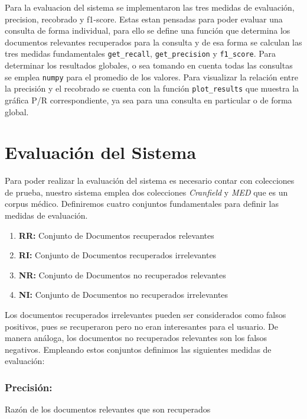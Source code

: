 \documentclass[runningheads,a4paper]{llncs}
\begin{document}

Para la evaluacion del sistema se implementaron las tres medidas de evaluación, precision, recobrado y f1-score. Estas estan pensadas para poder evaluar una consulta de forma individual, para ello se define una función que determina los documentos relevantes recuperados para la consulta y de esa forma se calculan las tres medidas fundamentales \verb*|get_recall|, \verb*|get_precision| y \verb*|f1_score|. Para determinar los resultados globales, o sea tomando en cuenta todas las consultas se emplea \verb*|numpy| para el promedio de los valores.
Para visualizar la relación entre la precisión y el recobrado se cuenta con la función \verb*|plot_results| que muestra la gráfica P/R correspondiente, ya sea para una consulta en particular o de forma global.  

\section{Evaluación del Sistema}

Para poder realizar la evaluación del sistema es necesario contar con colecciones de prueba, nuestro sistema emplea dos colecciones \textit{Cranfield} y \textit{MED} que es un corpus médico. Definiremos cuatro conjuntos fundamentales para definir las medidas de evaluación. 

\begin{enumerate}
	\item[] \textbf{RR:} Conjunto de Documentos recuperados relevantes
	\item[] \textbf{RI:} Conjunto de Documentos recuperados irrelevantes
	\item[] \textbf{NR:} Conjunto de Documentos no recuperados relevantes
	\item[] \textbf{NI:} Conjunto de Documentos no recuperados irrelevantes
\end{enumerate}

Los documentos recuperados irrelevantes pueden ser considerados como falsos
positivos, pues se recuperaron pero no eran interesantes para el usuario. De
manera análoga, los documentos no recuperados relevantes son los falsos
negativos. Empleando estos conjuntos definimos las siguientes medidas de evaluación:

\subsubsection*{Precisión:} Razón de los documentos relevantes que son recuperados
\end{document}
